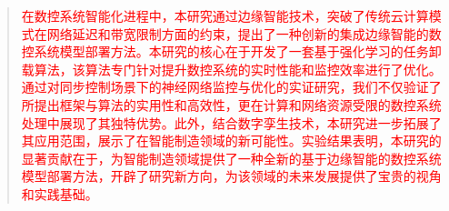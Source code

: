 \documentclass[preprint,12pt]{elsarticle}
\begin{document}
\begin{frontmatter}










\begin{abstract}
\textcolor{red}{在数控系统智能化进程中，本研究通过边缘智能技术，突破了传统云计算模式在网络延迟和带宽限制方面的约束，提出了一种创新的集成边缘智能的数控系统模型部署方法。本研究的核心在于开发了一套基于强化学习的任务卸载算法，该算法专门针对提升数控系统的实时性能和监控效率进行了优化。通过对同步控制场景下的神经网络监控与优化的实证研究，我们不仅验证了所提出框架与算法的实用性和高效性，更在计算和网络资源受限的数控系统处理中展现了其独特优势。此外，结合数字孪生技术，本研究进一步拓展了其应用范围，展示了在智能制造领域的新可能性。实验结果表明，本研究的显著贡献在于，为智能制造领域提供了一种全新的基于边缘智能的数控系统模型部署方法，开辟了研究新方向，为该领域的未来发展提供了宝贵的视角和实践基础。}

\end{abstract}




\end{frontmatter}
\end{document}
